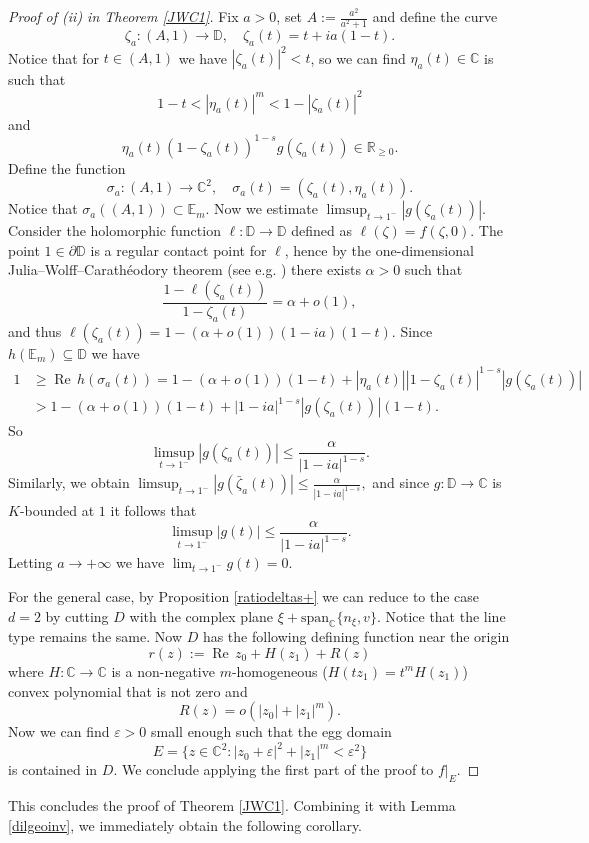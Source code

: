 \documentclass[11pt, reqno]{amsart}
\numberwithin{equation}{section}
\theoremstyle{definition}
\newcommand{\C}{\mathbb{C}}
\newcommand{\D}{\mathbb{D}}
\newcommand{\R}{\mathbb{R}}
\renewcommand{\Re}{{\operatorname{Re}\,}}
\begin{document}
{{{\begin{proof}[Proof of (ii) in  Theorem \ref{JWC1}]
			Fix $a>0$, set $A:=\frac{a^2}{a^2+1}$  and define the curve
			$$\zeta_a\colon (A,1)\to \D,\quad \zeta_a(t)=t+ia(1-t).$$
			Notice that for $t\in (A,1)$ we have
			$|\zeta_a(t)|^2<t$,
			so we can find $\eta_a(t)\in\C$ is such that 
			$$1-t<|\eta_a(t)|^m< 1-|\zeta_a(t)|^2$$
			and 
			$$\eta_a(t)(1-\zeta_a(t))^{1-s}g(\zeta_a(t))\in\R_{\geq0}.$$
			Define the function 
			$$\sigma_a\colon (A,1)\to \C^2,\quad \sigma_a(t)=(\zeta_a(t),\eta_a(t)).$$ 
			Notice that $\sigma_a((A,1))\subset \mathbb{E}_m$.
			Now we  estimate 
			$\limsup_{t\to1^-}|g(\zeta_a(t))|.$
			Consider the holomorphic function $\ell\colon \D\to \D$ defined as $\ell(\zeta)=f(\zeta,0)$. The point $1\in\partial\D$ is a regular contact point for $\ell$, hence  by the one-dimensional Julia--Wolff--Carath\'eodory theorem (see e.g. \cite[Theorem 1.2.7]{Abatebook}) there exists $\alpha>0$  such that
			$$\frac{1-\ell(\zeta_a(t))}{1-\zeta_a(t)}=\alpha+o(1),$$
			and thus
			$\ell(\zeta_a(t))=1-(\alpha+o(1))(1-ia)(1-t)$. Since $h(\mathbb{E}_m)\subseteq\D$ we have
			\begin{align*}1&\geq \Re h(\sigma_a(t))=1-(\alpha+o(1))(1-t)+|\eta_a(t)||1-\zeta_a(t)|^{1-s}|g(\zeta_a(t))|\\&>1-(\alpha+o(1))(1-t)+|1-ia|^{1-s}|g(\zeta_a(t))|(1-t).\end{align*}
			So
			$$\limsup_{t\to1^-}|g(\zeta_a(t))|\leq \frac{\alpha}{|1-ia|^{1-s}}.$$ Similarly, we obtain
			$\limsup_{t\to1^-}|g(\bar\zeta_a(t))|\leq \frac{\alpha}{|1-ia|^{1-s}},$ and since  $g\colon\D\to\C$ is $K$-bounded at $1$ 
			it follows that
			$$\limsup_{t\to1^-}|g(t)|\leq \frac{\alpha}{|1-ia|^{1-s}}.$$ Letting $a\to+\infty$ we have 
			$\lim_{t\to 1^-}g(t)=0$.
			
			For the general case, by Proposition \ref{ratiodeltas+} we can reduce to the case  $d=2$ by  cutting $D$ with the complex plane $\xi+\text{span}_\C\{n_\xi,v\}$.
			Notice that the line type remains the same. Now $D$ has the following defining function near the origin $$r(z):=\Re z_0+ H(z_1)+R(z)$$
			where $H\colon\C\to\C$ is a non-negative $m$-homogeneous ($H(tz_1)=t^{m}H(z_1)$) convex polynomial that is not zero and 
			$$R(z)=o(|z_0|+|z_1|^{m}).$$
			Now we can find $\varepsilon>0$ small enough such that the egg domain
			$$E=\{z\in\C^2:|z_0+\varepsilon|^2+|z_1|^{m}<\varepsilon^2\}$$
			is contained in $D$. We conclude applying the first part of the proof to $f|_E$.
		\end{proof}
		This concludes the proof of Theorem \ref{JWC1}. Combining it with Lemma \ref{dilgeoinv}, we immediately obtain the following corollary.
		
}}}
\end{document}
